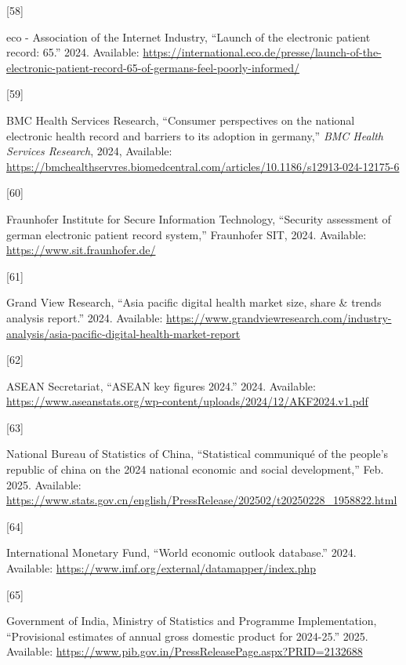 \documentclass[
  a4paper,
  a4paper,
  11pt]{ltjsbook}
\newlength{\cslhangindent}
\newlength{\csllabelwidth}
\newenvironment{CSLReferences}[2] %
 {\begin{list}{}{%
  \setlength{\itemindent}{0pt}
  \setlength{\leftmargin}{0pt}
  \setlength{\parsep}{0pt}
  \ifodd #1
   \setlength{\leftmargin}{\cslhangindent}
   \setlength{\itemindent}{-1\cslhangindent}
  \fi
  \setlength{\itemsep}{#2\baselineskip}}}
 {\end{list}}
\newcommand{\CSLLeftMargin}[1]{\parbox[t]{\csllabelwidth}{\strut#1\strut}}
\newcommand{\CSLRightInline}[1]{\parbox[t]{\linewidth - \csllabelwidth}{\strut#1\strut}}
\begin{document}
\begin{CSLReferences}{0}{0}
\CSLLeftMargin{{[}58{]} }%
\CSLRightInline{eco - Association of the Internet Industry, {``Launch of
the electronic patient record: 65.''} 2024. Available:
\url{https://international.eco.de/presse/launch-of-the-electronic-patient-record-65-of-germans-feel-poorly-informed/}}

\CSLLeftMargin{{[}59{]} }%
\CSLRightInline{BMC Health Services Research, {``Consumer perspectives
on the national electronic health record and barriers to its adoption in
germany,''} \emph{BMC Health Services Research}, 2024, Available:
\url{https://bmchealthservres.biomedcentral.com/articles/10.1186/s12913-024-12175-6}}

\CSLLeftMargin{{[}60{]} }%
\CSLRightInline{Fraunhofer Institute for Secure Information Technology,
{``Security assessment of german electronic patient record system,''}
Fraunhofer SIT, 2024. Available: \url{https://www.sit.fraunhofer.de/}}

\CSLLeftMargin{{[}61{]} }%
\CSLRightInline{Grand View Research, {``Asia pacific digital health
market size, share \& trends analysis report.''} 2024. Available:
\url{https://www.grandviewresearch.com/industry-analysis/asia-pacific-digital-health-market-report}}

\CSLLeftMargin{{[}62{]} }%
\CSLRightInline{ASEAN Secretariat, {``ASEAN key figures 2024.''} 2024.
Available:
\url{https://www.aseanstats.org/wp-content/uploads/2024/12/AKF2024.v1.pdf}}

\CSLLeftMargin{{[}63{]} }%
\CSLRightInline{National Bureau of Statistics of China, {``Statistical
communiqué of the people's republic of china on the 2024 national
economic and social development,''} Feb. 2025. Available:
\url{https://www.stats.gov.cn/english/PressRelease/202502/t20250228_1958822.html}}

\CSLLeftMargin{{[}64{]} }%
\CSLRightInline{International Monetary Fund, {``World economic outlook
database.''} 2024. Available:
\url{https://www.imf.org/external/datamapper/index.php}}

\CSLLeftMargin{{[}65{]} }%
\CSLRightInline{Government of India, Ministry of Statistics and
Programme Implementation, {``Provisional estimates of annual gross
domestic product for 2024-25.''} 2025. Available:
\url{https://www.pib.gov.in/PressReleasePage.aspx?PRID=2132688}}


\end{CSLReferences}
\end{document}
